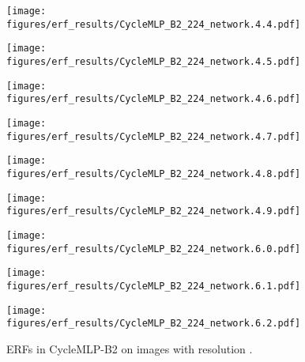 \documentclass{article}
\begin{document}
\begin{figure}[tb]
\begin{minipage}[t]{0.13\hsize}
    \label{figure:erf_cyclemlp:8}
  \end{minipage}
  \begin{minipage}[t]{0.13\hsize}
    \centering
    \texttt{[image: figures/erf\_results/CycleMLP\_B2\_224\_network.4.4.pdf]}
    \label{figure:erf_cyclemlp:9}
  \end{minipage}
  \begin{minipage}[t]{0.13\hsize}
    \centering
    \texttt{[image: figures/erf\_results/CycleMLP\_B2\_224\_network.4.5.pdf]}
    \label{figure:erf_cyclemlp:10}
  \end{minipage}
  \begin{minipage}[t]{0.13\hsize}
    \centering
    \texttt{[image: figures/erf\_results/CycleMLP\_B2\_224\_network.4.6.pdf]}
    \label{figure:erf_cyclemlp:11}
  \end{minipage}
  \begin{minipage}[t]{0.13\hsize}
    \centering
    \texttt{[image: figures/erf\_results/CycleMLP\_B2\_224\_network.4.7.pdf]}
    \label{figure:erf_cyclemlp:12}
  \end{minipage}
  \begin{minipage}[t]{0.13\hsize}
    \centering
    \texttt{[image: figures/erf\_results/CycleMLP\_B2\_224\_network.4.8.pdf]}
    \label{figure:erf_cyclemlp:13}
  \end{minipage}
  \begin{minipage}[t]{0.13\hsize}
    \centering
    \texttt{[image: figures/erf\_results/CycleMLP\_B2\_224\_network.4.9.pdf]}
    \label{figure:erf_cyclemlp:14}
  \end{minipage}
  \begin{minipage}[t]{0.13\hsize}
    \centering
    \texttt{[image: figures/erf\_results/CycleMLP\_B2\_224\_network.6.0.pdf]}
    \label{figure:erf_cyclemlp:15}
  \end{minipage}
  \begin{minipage}[t]{0.13\hsize}
    \centering
    \texttt{[image: figures/erf\_results/CycleMLP\_B2\_224\_network.6.1.pdf]}
    \label{figure:erf_cyclemlp:16}
  \end{minipage}
  \begin{minipage}[t]{0.13\hsize}
    \centering
    \texttt{[image: figures/erf\_results/CycleMLP\_B2\_224\_network.6.2.pdf]}
    \label{figure:erf_cyclemlp:17}
  \end{minipage}
  \caption{ERFs in CycleMLP-B2 \cite{chen2022cyclemlp} on images with resolution .}
    \label{figure:erf_cyclemlp}
\end{figure} 
\end{document}
